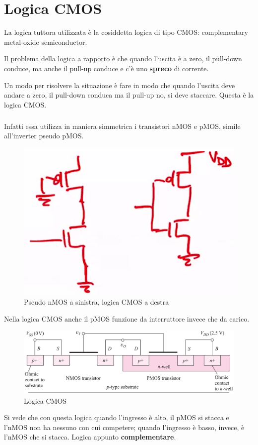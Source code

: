 \newpage
\chapter{Logica CMOS}

La logica tuttora utilizzata è la cosiddetta logica di tipo CMOS: complementary metal-oxide semiconductor.

Il problema della logica a rapporto è che quando l'uscita è a zero, il pull-down conduce, ma anche il pull-up conduce e c'è uno \textbf{spreco} di corrente. 

Un modo per risolvere la situazione è fare in modo che quando l'uscita deve andare a zero, il pull-down conduca ma il pull-up no, si deve staccare. Questa è la logica CMOS.

\paragraph{}
Infatti essa utilizza in maniera simmetrica i transistori nMOS e pMOS, simile all'inverter pseudo pMOS.


\begin{figure}[htbp]
    \centering
    \includegraphics[width=0.25\linewidth]{img/pseudo_inv_e_CMOS.png}
    \caption{Pseudo nMOS a sinistra, logica CMOS a destra}
    
\end{figure}

Nella logica CMOS anche il pMOS funzione da interruttore invece che da carico.


\begin{figure}[htbp]
    \centering
    \includegraphics[width=0.60\linewidth]{img/CMOS.png}
    \caption{Logica CMOS}
    
\end{figure}

Si vede che con questa logica quando l'ingresso è alto, il pMOS si stacca e l'nMOS non ha nessuno con cui competere; quando l'ingresso è basso, invece, è l'nMOS che si stacca. Logica appunto \textbf{complementare}.

